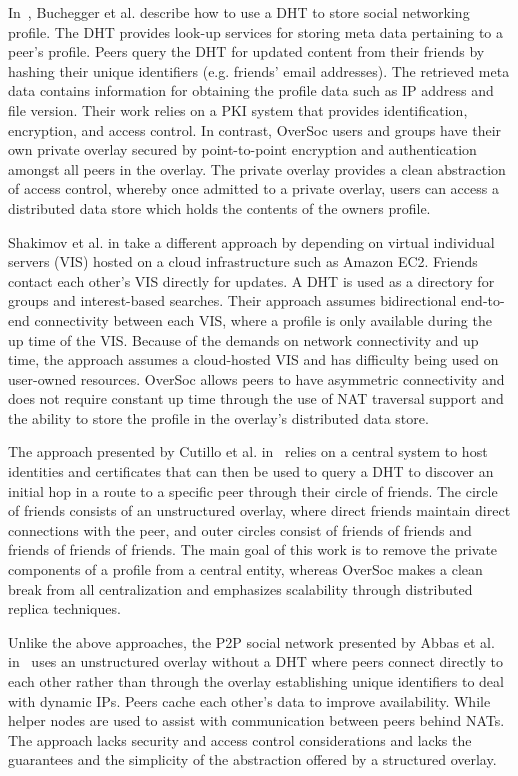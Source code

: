 \documentclass{sig-alternate}
\begin{document}
In~\cite{peerson}, Buchegger et al. describe how to use a DHT to store social
networking profile.  The DHT provides look-up services for storing meta data
pertaining to a peer's profile.  Peers query the DHT for updated content from
their friends by hashing their unique identifiers (e.g. friends' email
addresses).  The retrieved meta data contains information for obtaining the
profile data such as IP address and file version. Their work relies on a PKI
system that provides identification, encryption, and access control.  In
contrast, OverSoc users and groups have their own private overlay secured by
point-to-point encryption and authentication amongst all peers in the overlay.
The private overlay provides a clean abstraction of access control, whereby
once admitted to a private overlay, users can access a distributed data store
which holds the contents of the owners profile.

Shakimov et al. in \cite{vis-a-vis} take a different approach by depending on
virtual individual servers (VIS) hosted on a cloud infrastructure such as
Amazon EC2. Friends contact each other's VIS directly for updates.  A DHT is
used as a directory for groups and interest-based searches. Their approach
assumes bidirectional end-to-end connectivity between each VIS, where a profile
is only available during the up time of the VIS.  Because of the demands on
network connectivity and up time, the approach assumes a cloud-hosted VIS and
has difficulty being used on user-owned resources.  OverSoc allows peers to
have  asymmetric connectivity and does not require constant up time through the
use of NAT traversal support and the ability to store the profile in the
overlay's distributed data store.

The approach presented by Cutillo et al. in~\cite{matryoshka} relies on a
central system to host identities and certificates that can then be used to
query a DHT to discover an initial hop in a route to a specific peer through
their circle of friends.  The circle of friends consists of an unstructured
overlay, where direct friends maintain direct connections with the peer, and
outer circles consist of friends of friends and friends of friends of friends.
The main goal of this work is to remove the private components of a profile
from a central entity, whereas OverSoc makes a clean break from all
centralization and emphasizes scalability through distributed replica
techniques.

Unlike the above approaches, the P2P social network presented by Abbas et al.
in~\cite{tribler-osn} uses an unstructured overlay without a DHT where peers
connect directly to each other rather than through the overlay establishing
unique identifiers to deal with dynamic IPs.  Peers cache each other's data to
improve availability.  While helper nodes are used to assist with
communication between peers behind NATs.  The approach lacks security and
access control considerations and lacks the guarantees and the simplicity of
the abstraction offered by a structured overlay.
\end{document}
